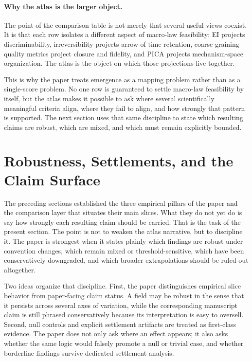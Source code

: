 \documentclass[11pt]{article}
\theoremstyle{definition}
\begin{document}
\paragraph{Why the atlas is the larger object.}
The point of the comparison table is not merely that several useful views coexist. It is that each row isolates a different aspect of macro-law feasibility: EI projects discriminability, irreversibility projects arrow-of-time retention, coarse-graining-quality metrics project closure and fidelity, and PICA projects mechanism-space organization. The atlas is the object on which those projections live together.

\FloatBarrier

This is why the paper treats emergence as a mapping problem rather than as a single-score problem. No one row is guaranteed to settle macro-law feasibility by itself, but the atlas makes it possible to ask where several scientifically meaningful criteria align, where they fail to align, and how strongly that pattern is supported. The next section uses that same discipline to state which resulting claims are robust, which are mixed, and which must remain explicitly bounded.
 \section{Robustness, Settlements, and the Claim Surface}\label{sec:robustness}

The preceding sections established the three empirical pillars of the paper and the comparison layer that situates their main slices. What they do not yet do is say how strongly each resulting claim should be carried. That is the task of the present section. The point is not to weaken the atlas narrative, but to discipline it. The paper is strongest when it states plainly which findings are robust under convention changes, which remain mixed or threshold-sensitive, which have been conservatively downgraded, and which broader extrapolations should be ruled out altogether.

Two ideas organize that discipline. First, the paper distinguishes empirical slice behavior from paper-facing claim status. A field may be robust in the sense that it persists across several axes of variation, while the corresponding manuscript claim is still phrased conservatively because its interpretation is easy to oversell. Second, null controls and explicit settlement artifacts are treated as first-class evidence. The paper does not only ask where an effect appears; it also asks whether the same logic would falsely promote a null or trivial case, and whether borderline findings survive dedicated settlement analysis.
\end{document}
